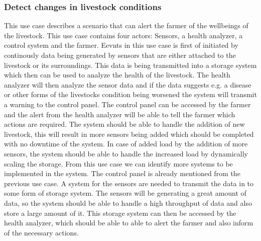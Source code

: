 \documentclass[conference]{IEEEtran}
\begin{document}
\subsubsection{Detect changes in livestock conditions}
This use case describes a scenario that can alert the farmer of the wellbeings of the livestock. This use case contains four actors: Sensors, a health analyzer, a control system and the farmer.
Eevnts in this use case is first of initiated by continously data being generated by sensors that are either attached to the livestock or its surroundings. This data is being transmitted into a storage system which then can be used to analyze the health of the livestock.
The health analyzer will then analyze the sensor data and if the data suggests e.g. a disease or other forms of the livestocks condition being worsened the system will transmit a warning to the control panel.
The control panel can be accessed by the farmer and the alert from the health analyzer will be able to tell the farmer which actions are required. The system should be able to handle the addition of new livestock, this will result in more sensors being added which should be completed with no downtime of the system.
In case of added load by the addition of more sensors, the system should be able to handle the increased load by dynamically scaling the storage. \newline
From this use case we can identify more systems to be implemented in the system. The control panel is already mentioned from the previous use case.
A system for the sensors are needed to transmit the data in to some form of storage system. The sensors will be generating a great amount of data, so the system should be able to handle a high throughput of data and also store a large amount of it.
This storage system can then be accessed by the health analyzer, which should be able to able to alert the farmer and also inform of the necessary actions. \newline
\end{document}
